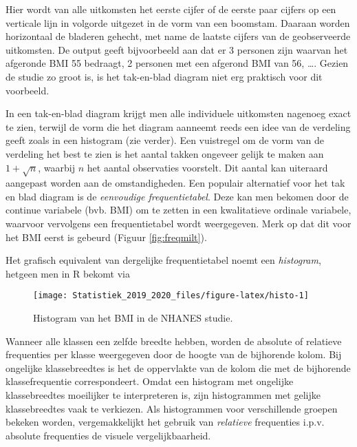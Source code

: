\documentclass[12pt,dutch,coursenotes]{book}
\newenvironment{Shaded}{\begin{snugshade}}{\end{snugshade}}
\newcommand{\KeywordTok}[1]{\textcolor[rgb]{0.13,0.29,0.53}{\textbf{#1}}}
\newcommand{\DataTypeTok}[1]{\textcolor[rgb]{0.13,0.29,0.53}{#1}}
\newcommand{\StringTok}[1]{\textcolor[rgb]{0.31,0.60,0.02}{#1}}
\newcommand{\CommentTok}[1]{\textcolor[rgb]{0.56,0.35,0.01}{\textit{#1}}}
\newcommand{\OperatorTok}[1]{\textcolor[rgb]{0.81,0.36,0.00}{\textbf{#1}}}
\newcommand{\NormalTok}[1]{#1}
\theoremstyle{definition}
\theoremstyle{definition}
\theoremstyle{definition}
\theoremstyle{remark}
\begin{document}
Hier wordt van alle uitkomsten het eerste cijfer of de eerste paar
cijfers op een verticale lijn in volgorde uitgezet in de vorm van een
boomstam. Daaraan worden horizontaal de bladeren gehecht, met name de
laatste cijfers van de geobserveerde uitkomsten. De output geeft
bijvoorbeeld aan dat er 3 personen zijn waarvan het afgeronde BMI 55
bedraagt, 2 personen met een afgerond BMI van 56, \ldots{}. Gezien de
studie zo groot is, is het tak-en-blad diagram niet erg praktisch voor
dit voorbeeld.

In een tak-en-blad diagram krijgt men alle individuele uitkomsten
nagenoeg exact te zien, terwijl de vorm die het diagram aanneemt reeds
een idee van de verdeling geeft zoals in een histogram (zie verder). Een
vuistregel om de vorm van de verdeling het best te zien is het aantal
takken ongeveer gelijk te maken aan \(1 + \sqrt{n}\), waarbij \(n\) het
aantal observaties voorstelt. Dit aantal kan uiteraard aangepast worden
aan de omstandigheden. Een populair alternatief voor het tak en blad
diagram is de \emph{eenvoudige frequentietabel}. Deze kan men bekomen
door de continue variabele (bvb. BMI) om te zetten in een kwalitatieve
ordinale variabele, waarvoor vervolgens een frequentietabel wordt
weergegeven. Merk op dat dit voor het BMI eerst is gebeurd (Figuur
\ref{fig:freqmilt}).

Het grafisch equivalent van dergelijke frequentietabel noemt een
\emph{histogram}, hetgeen men in R bekomt via

\begin{Shaded}
\end{Shaded}

\begin{figure}

{\centering \texttt{[image: Statistiek\_2019\_2020\_files/figure-latex/histo-1]} 

}

\caption{Histogram van het BMI in de NHANES studie.}\label{fig:histo}
\end{figure}

Wanneer alle klassen een zelfde breedte hebben, worden de absolute of
relatieve frequenties per klasse weergegeven door de hoogte van de
bijhorende kolom. Bij ongelijke klassebreedtes is het de oppervlakte van
de kolom die met de bijhorende klassefrequentie correspondeert. Omdat
een histogram met ongelijke klassebreedtes moeilijker te interpreteren
is, zijn histogrammen met gelijke klassebreedtes vaak te verkiezen. Als
histogrammen voor verschillende groepen bekeken worden, vergemakkelijkt
het gebruik van \emph{relatieve} frequenties i.p.v. absolute frequenties
de visuele vergelijkbaarheid.
\end{document}
